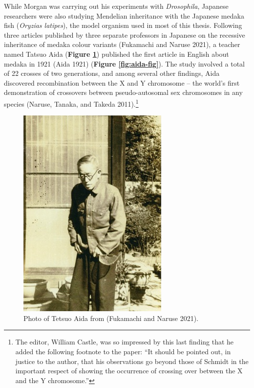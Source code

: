 \documentclass[
]{book}
\begin{document}
While Morgan was carrying out his experiments with \emph{Drosophila}, Japanese researchers were also studying Mendelian inheritance with the Japanese medaka fish (\emph{Oryzias latipes}), the model organism used in most of this thesis. Following three articles published by three separate professors in Japanese on the recessive inheritance of medaka colour variants (Fukamachi and Naruse 2021), a teacher named Tatsuo Aida (\textbf{Figure \ref{fig:aida}}) published the first article in English about medaka in 1921 (Aida 1921) (\textbf{Figure \ref{fig:aida-fig}}). The study involved a total of 22 crosses of two generations, and among several other findings, Aida discovered recombination between the X and Y chromosome -- the world's first demonstration of crossovers between pseudo-autosomal sex chromosomes in any species (Naruse, Tanaka, and Takeda 2011).\footnote{The editor, William Castle, was so impressed by this last finding that he added the following footnote to the paper: ``It should be pointed out, in justice to the author, that his observations go beyond those of Schmidt in the important respect of showing the occurrence of crossing over between the X and the Y chromosome.''}



\begin{figure}

{\centering \includegraphics[width=0.8\linewidth]{figs/introduction/Aida} 

}

\caption{Photo of Tetsuo Aida from (Fukamachi and Naruse 2021).}\label{fig:aida}
\end{figure}
\end{document}
